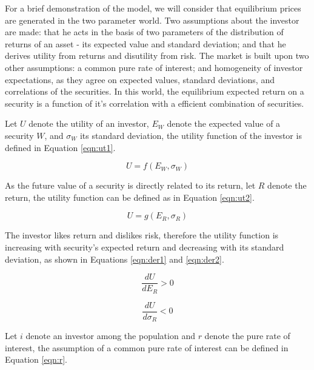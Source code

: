 \documentclass[cic,tc, english]{iiufrgs}
\begin{document}
    For a brief demonstration of the model, we will consider that equilibrium prices are generated in the two parameter \citet{sharpe1964} world. Two assumptions about the investor are made: that he acts in the basis of two parameters of the distribution of returns of an asset - its expected value and standard deviation; and that he derives utility from returns and disutility from risk. The market is built upon two other assumptions: a common pure rate of interest; and homogeneity of investor expectations, as they agree on expected values, standard deviations, and correlations of the securities. In this world, the equilibrium expected return on a security is a function of it's correlation with a efficient combination of securities.
    
    Let $U$ denote the utility of an investor, $E_W$ denote the expected value of a security $W$, and $\sigma_W$ its standard deviation, the utility function of the investor is defined in Equation \ref{eqn:ut1}.
    
    \begin{equation}
        \label{eqn:ut1}
        U = f(E_W, \sigma_W)
    \end{equation}
    
    As the future value of a security is directly related to its return, let $R$ denote the return, the utility function can be defined as in Equation \ref{eqn:ut2}.

    \begin{equation}
        \label{eqn:ut2}
        U = g(E_R, \sigma_R)
    \end{equation}

    The investor likes return and dislikes risk, therefore the utility function is increasing with security's expected return and decreasing with its standard deviation, as shown in Equations \ref{eqn:der1} and \ref{eqn:der2}.
    
    \begin{equation}
        \label{eqn:der1}
        \frac{dU}{dE_R} > 0
    \end{equation}

    \begin{equation}
        \label{eqn:der2}
        \frac{dU}{d\sigma_R} < 0
    \end{equation}

    Let $i$ denote an investor among the population and $r$ denote the pure rate of interest, the assumption of a common pure rate of interest can be defined in Equation \ref{eqn:r}.
\end{document}

